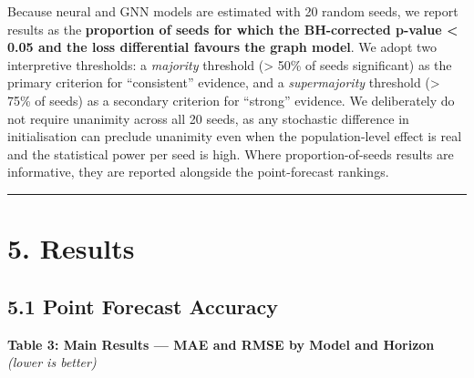 \documentclass[
  11pt,
  a4paper]{article}
\begin{document}
Because neural and GNN models are estimated with 20 random seeds, we
report results as the \textbf{proportion of seeds for which the
BH-corrected p-value \textless{} 0.05 and the loss differential favours
the graph model}. We adopt two interpretive thresholds: a
\emph{majority} threshold (\textgreater{} 50\% of seeds significant) as
the primary criterion for ``consistent'' evidence, and a
\emph{supermajority} threshold (\textgreater{} 75\% of seeds) as a
secondary criterion for ``strong'' evidence. We deliberately do not
require unanimity across all 20 seeds, as any stochastic difference in
initialisation can preclude unanimity even when the population-level
effect is real and the statistical power per seed is high. Where
proportion-of-seeds results are informative, they are reported alongside
the point-forecast rankings.

\begin{center}\rule{0.5\linewidth}{0.5pt}\end{center}

\section{5. Results}\label{results}

\subsection{5.1 Point Forecast Accuracy}\label{point-forecast-accuracy}

\textbf{Table 3: Main Results --- MAE and RMSE by Model and Horizon}
\emph{(lower is better)}
\end{document}
